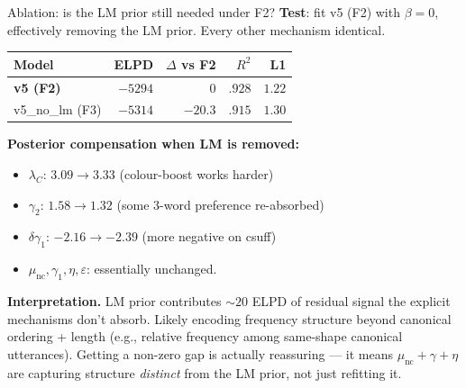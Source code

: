 \documentclass[10pt,aspectratio=169]{beamer}
\newcommand{\main}[1]{\textcolor{CSP-main-dark}{\textbf{#1}}}
\newcommand{\emp}[1]{\textcolor{CSP-emphasis}{\textbf{#1}}}
\begin{document}
\begin{frame}{Ablation: is the LM prior still needed under F2?}
\small
\main{Test}: fit v5 (F2) with $\beta = 0$, effectively removing the LM prior. Every other mechanism identical.

\vspace{0.6em}
\begin{center}
\begin{tabular}{lrrrr}
\toprule
Model         & ELPD    & $\Delta$ vs F2 & $R^2$ & L1 \\
\midrule
\main{v5 (F2)}   & \main{$-5294$} & $0$     & \main{$.928$} & \main{$1.22$} \\
v5\_no\_lm (F3)  & $-5314$ & $-20.3$ & $.915$ & $1.30$ \\
\bottomrule
\end{tabular}
\end{center}

\vspace{0.6em}
\main{Posterior compensation when LM is removed:}
\begin{itemize}\itemsep0.15em
  \item $\lambda_C$: $3.09 \to 3.33$ (colour-boost works harder)
  \item $\gamma_2$: $1.58 \to 1.32$ (some 3-word preference re-absorbed)
  \item $\delta\gamma_1$: $-2.16 \to -2.39$ (more negative on csuff)
  \item $\mu_\mathrm{nc}, \gamma_1, \eta, \varepsilon$: essentially unchanged.
\end{itemize}

\vspace{0.6em}
\emp{Interpretation.} LM prior contributes $\sim\!20$ ELPD of residual signal the explicit mechanisms don't absorb. Likely encoding frequency structure beyond canonical ordering + length (e.g., relative frequency among same-shape canonical utterances). Getting a non-zero gap is actually reassuring --- it means $\mu_\mathrm{nc} + \gamma + \eta$ are capturing structure \emph{distinct} from the LM prior, not just refitting it.
\end{frame}
\end{document}
